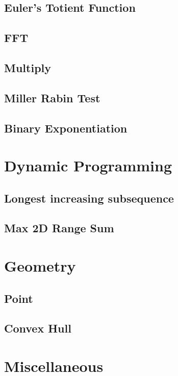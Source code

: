 \subsection{Euler’s Totient Function}
\raggedbottom
\hrulefill
\subsection{FFT}
\raggedbottom
\hrulefill
\subsection{Multiply}
\raggedbottom
\hrulefill
\subsection{Miller Rabin Test}
\raggedbottom
\hrulefill
\subsection{Binary Exponentiation}
\raggedbottom
\hrulefill

\section{Dynamic Programming}
\subsection{Longest increasing subsequence}
\raggedbottom
\hrulefill
\subsection{Max 2D Range Sum}
\raggedbottom
\hrulefill

\section{Geometry}
\subsection{Point}
\raggedbottom
\hrulefill
\subsection{Convex Hull}
\raggedbottom
\hrulefill

\section{Miscellaneous}

